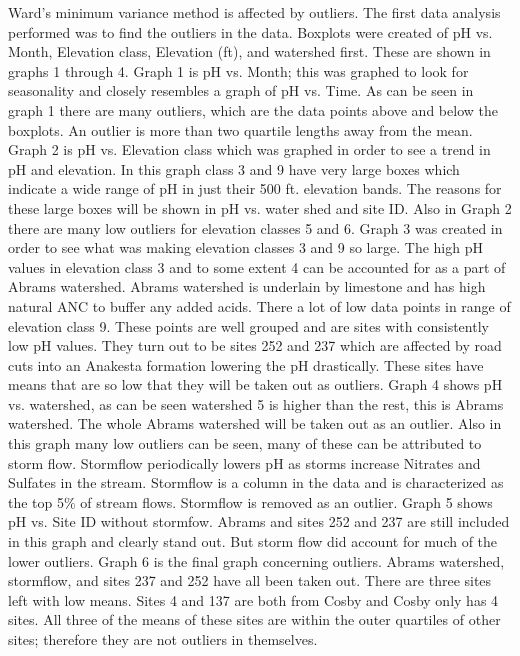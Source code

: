 \documentclass[11pt]{article} %
\begin{document}
Ward’s minimum variance method is affected by outliers.  The first data analysis performed was to find the outliers in the data.  Boxplots were created of pH vs. Month, Elevation class, Elevation (ft), and watershed first.  These are shown in graphs 1 through 4.   Graph 1 is pH vs. Month; this was graphed to look for seasonality and closely resembles a graph of pH vs. Time.  As can be seen in graph 1 there are many outliers, which are the data points above and below the boxplots.  An outlier is more than two quartile lengths away from the mean.  Graph 2 is pH vs. Elevation class which was graphed in order to see a trend in pH and elevation.  In this graph class 3 and 9 have very large boxes which indicate a wide range of pH in just their 500 ft. elevation bands.  The reasons for these large boxes will be shown in pH vs. water shed and site ID.  Also in Graph 2 there are many low outliers for elevation classes 5 and 6.  Graph 3 was created in order to see what was making elevation classes 3 and 9 so large.  The high pH values in elevation class 3 and to some extent 4 can be accounted for as a part of Abrams watershed.  Abrams watershed is underlain by limestone and has high natural ANC to buffer any added acids.  There a lot of low data points in range of elevation class 9.  These points are well grouped and are sites with consistently low pH values.  They turn out to be sites 252 and 237 which are affected by road cuts into an Anakesta formation lowering the pH drastically.  These sites have means that are so low that they will be taken out as outliers.  Graph 4 shows pH vs. watershed, as can be seen watershed 5 is higher than the rest, this is Abrams watershed.  The whole Abrams watershed will be taken out as an outlier.  Also in this graph many low outliers can be seen, many of these can be attributed to storm flow.  Stormflow periodically lowers pH as storms increase Nitrates and Sulfates in the stream.  Stormflow is a column in the data and is characterized as the top 5$\%$ of stream flows.  Stormflow is removed as an outlier.  Graph 5 shows pH vs. Site ID without stormfow.  Abrams and sites 252 and 237 are still included in this graph and clearly stand out.  But storm flow did account for much of the lower outliers.  Graph 6 is the final graph concerning outliers.  Abrams watershed, stormflow, and sites 237 and 252 have all been taken out.  There are three sites left with low means.  Sites 4 and 137 are both from Cosby and Cosby only has 4 sites.  All three of the means of these sites are within the outer quartiles of other sites; therefore they are not outliers in themselves.
	
\end{document}
